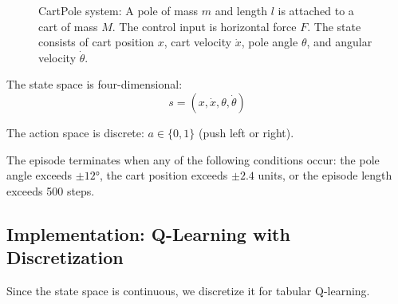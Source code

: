 \begin{figure}[htbp]
\centering
{}
\caption{CartPole system: A pole of mass $m$ and length $l$ is attached to a cart of mass $M$. The control input is horizontal force $F$. The state consists of cart position $x$, cart velocity $\dot{x}$, pole angle $\theta$, and angular velocity $\dot{\theta}$.}
\label{fig:cartpole}
\end{figure}

The state space is four-dimensional:
\begin{equation}
s = (x, \dot{x}, \theta, \dot{\theta})
\end{equation}

The action space is discrete: $a \in \{0, 1\}$ (push left or right).

The episode terminates when any of the following conditions occur: the pole angle exceeds $\pm 12°$, the cart position exceeds $\pm 2.4$ units, or the episode length exceeds 500 steps.

\subsection{Implementation: Q-Learning with Discretization}

Since the state space is continuous, we discretize it for tabular Q-learning.

